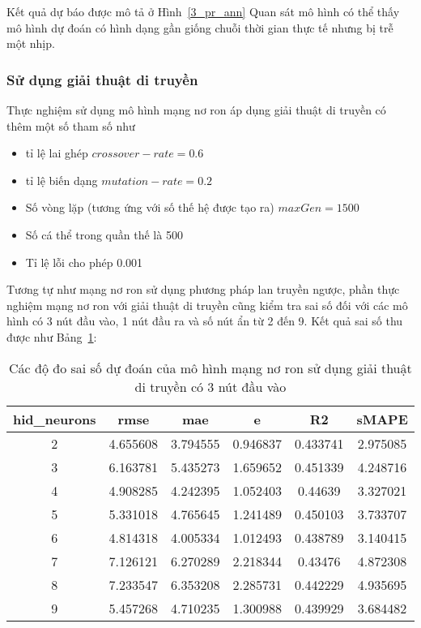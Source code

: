  Kết quả dự báo được mô tả ở Hình~\ref{3_pr_ann}
Quan sát mô hình có thể thấy mô hình dự đoán có hình dạng gần giống chuỗi thời gian thực tế nhưng bị trễ một nhịp.


\subsubsection{Sử dụng giải thuật di truyền}
Thực nghiệm sử dụng mô hình mạng nơ ron áp dụng giải thuật di truyền có thêm một số tham số như
\begin{itemize}
\item tỉ lệ lai ghép $crossover-rate = 0.6$
\item tỉ lệ biến dạng $mutation-rate = 0.2$
\item Số vòng lặp (tương ứng với số thế hệ được tạo ra) $maxGen = 1500$
\item Số cá thể trong quần thế là 500
\item Tỉ lệ lỗi cho phép 0.001
\end{itemize}

Tương tự như mạng nơ ron sử dụng phương pháp lan truyền ngược, phần thực nghiệm mạng nơ ron với giải thuật di truyền cũng kiểm tra sai số đối với các mô hình có 3 nút đầu vào, 1 nút đầu ra và số nút ẩn từ 2 đến 9. Kết quả sai số thu được như Bảng~\ref{nnga_err}:

\begin{table}[htbp]
  \centering
  \caption{Các độ đo sai số dự đoán của mô hình mạng nơ ron sử dụng giải thuật di truyền có 3 nút đầu vào}
    \begin{tabular}{cccccc}
    hid\_neurons & rmse  & mae   & e     & R2    & sMAPE \\ \hline
    2     & 4.655608 & 3.794555 & 0.946837 & 0.433741 & 2.975085 \\
    3     & 6.163781 & 5.435273 & 1.659652 & 0.451339 & 4.248716 \\
    4     & 4.908285 & 4.242395 & 1.052403 & 0.44639 & 3.327021 \\
    5     & 5.331018 & 4.765645 & 1.241489 & 0.450103 & 3.733707 \\
    6     & 4.814318 & 4.005334 & 1.012493 & 0.438789 & 3.140415 \\
    7     & 7.126121 & 6.270289 & 2.218344 & 0.43476 & 4.872308 \\
    8     & 7.233547 & 6.353208 & 2.285731 & 0.442229 & 4.935695 \\
    9     & 5.457268 & 4.710235 & 1.300988 & 0.439929 & 3.684482 \\
    \end{tabular}%
  \label{nnga_err}%
\end{table}%

